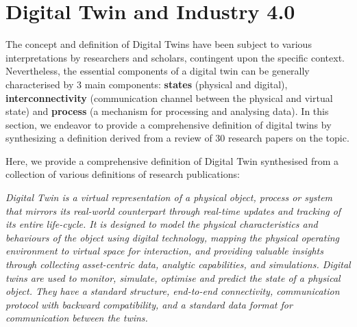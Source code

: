 

\section{Digital Twin and Industry 4.0}


The concept and definition of Digital Twins have been subject to various interpretations by researchers and scholars, contingent upon the specific context. Nevertheless, the essential components of a digital twin can be generally characterised by 3 main components: \textbf{states} (physical and digital), \textbf{interconnectivity} (communication channel between the physical and virtual state) and \textbf{process} (a mechanism for processing and analysing data). In this section, we endeavor to provide a comprehensive definition of digital twins by synthesizing a definition derived from a  review of 30 research papers on the topic.

Here, we provide a comprehensive definition of Digital Twin synthesised from a collection of various definitions of research publications:

\textit{ Digital Twin is a virtual representation of a physical object, process or system that mirrors its real-world counterpart through real-time updates and tracking of its entire life-cycle. It is designed to model the physical characteristics and behaviours of the object using digital technology, mapping the physical operating environment to virtual space for interaction, and providing valuable insights through collecting asset-centric data, analytic capabilities, and simulations. Digital twins are used to monitor, simulate, optimise and predict the state of a physical object. They have a standard structure, end-to-end connectivity, communication protocol with backward compatibility, and a standard data format for communication between the twins.}

